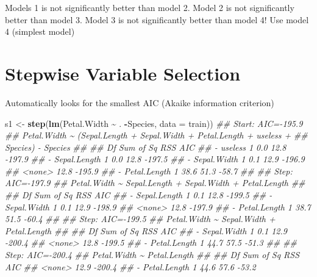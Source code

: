 \documentclass[
  notitlepage]{book}
\newenvironment{Shaded}{\begin{snugshade}}{\end{snugshade}}
\newcommand{\CommentTok}[1]{\textcolor[rgb]{0.56,0.35,0.01}{\textit{#1}}}
\newcommand{\DataTypeTok}[1]{\textcolor[rgb]{0.13,0.29,0.53}{#1}}
\newcommand{\KeywordTok}[1]{\textcolor[rgb]{0.13,0.29,0.53}{\textbf{#1}}}
\newcommand{\NormalTok}[1]{#1}
\newcommand{\OperatorTok}[1]{\textcolor[rgb]{0.81,0.36,0.00}{\textbf{#1}}}
\newcommand{\StringTok}[1]{\textcolor[rgb]{0.31,0.60,0.02}{#1}}
\begin{document}
Models 1 is not significantly better than model 2. Model 2 is not significantly better than model 3. Model 3 is not significantly better than model 4! Use model 4 (simplest model)

\hypertarget{stepwise-variable-selection}{%
\section{Stepwise Variable Selection}\label{stepwise-variable-selection}}

Automatically looks for the smallest AIC (Akaike information criterion)

\begin{Shaded}
\begin{Highlighting}[]
\NormalTok{s1 \textless{}{-}}\StringTok{ }\KeywordTok{step}\NormalTok{(}\KeywordTok{lm}\NormalTok{(Petal.Width }\OperatorTok{\textasciitilde{}}\StringTok{ }\NormalTok{. }\OperatorTok{{-}}\NormalTok{Species, }\DataTypeTok{data =}\NormalTok{ train))}
\CommentTok{\#\# Start:  AIC={-}195.9}
\CommentTok{\#\# Petal.Width \textasciitilde{} (Sepal.Length + Sepal.Width + Petal.Length + useless + }
\CommentTok{\#\#     Species) {-} Species}
\CommentTok{\#\# }
\CommentTok{\#\#                Df Sum of Sq  RSS    AIC}
\CommentTok{\#\# {-} useless       1       0.0 12.8 {-}197.9}
\CommentTok{\#\# {-} Sepal.Length  1       0.0 12.8 {-}197.5}
\CommentTok{\#\# {-} Sepal.Width   1       0.1 12.9 {-}196.9}
\CommentTok{\#\# \textless{}none\textgreater{}                      12.8 {-}195.9}
\CommentTok{\#\# {-} Petal.Length  1      38.6 51.3  {-}58.7}
\CommentTok{\#\# }
\CommentTok{\#\# Step:  AIC={-}197.9}
\CommentTok{\#\# Petal.Width \textasciitilde{} Sepal.Length + Sepal.Width + Petal.Length}
\CommentTok{\#\# }
\CommentTok{\#\#                Df Sum of Sq  RSS    AIC}
\CommentTok{\#\# {-} Sepal.Length  1       0.1 12.8 {-}199.5}
\CommentTok{\#\# {-} Sepal.Width   1       0.1 12.9 {-}198.9}
\CommentTok{\#\# \textless{}none\textgreater{}                      12.8 {-}197.9}
\CommentTok{\#\# {-} Petal.Length  1      38.7 51.5  {-}60.4}
\CommentTok{\#\# }
\CommentTok{\#\# Step:  AIC={-}199.5}
\CommentTok{\#\# Petal.Width \textasciitilde{} Sepal.Width + Petal.Length}
\CommentTok{\#\# }
\CommentTok{\#\#                Df Sum of Sq  RSS    AIC}
\CommentTok{\#\# {-} Sepal.Width   1       0.1 12.9 {-}200.4}
\CommentTok{\#\# \textless{}none\textgreater{}                      12.8 {-}199.5}
\CommentTok{\#\# {-} Petal.Length  1      44.7 57.5  {-}51.3}
\CommentTok{\#\# }
\CommentTok{\#\# Step:  AIC={-}200.4}
\CommentTok{\#\# Petal.Width \textasciitilde{} Petal.Length}
\CommentTok{\#\# }
\CommentTok{\#\#                Df Sum of Sq  RSS    AIC}
\CommentTok{\#\# \textless{}none\textgreater{}                      12.9 {-}200.4}
\CommentTok{\#\# {-} Petal.Length  1      44.6 57.6  {-}53.2}
\end{Highlighting}
\end{Shaded}
\end{document}
